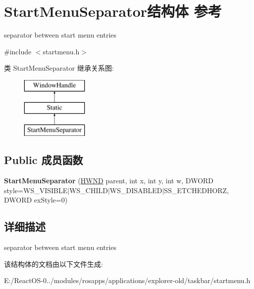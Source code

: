 \hypertarget{struct_start_menu_separator}{}\section{Start\+Menu\+Separator结构体 参考}
\label{struct_start_menu_separator}


separator between start menu entries  




{\ttfamily \#include $<$startmenu.\+h$>$}

类 Start\+Menu\+Separator 继承关系图\+:\begin{figure}[H]
\begin{center}
\leavevmode
\includegraphics[height=3.000000cm]{struct_start_menu_separator}
\end{center}
\end{figure}
\subsection*{Public 成员函数}
\begin{DoxyCompactItemize}
\item 
\mbox{\label{struct_start_menu_separator_a7c6a77ba08f0a69b45c78062ea1a1fc7}} 
{\bfseries Start\+Menu\+Separator} (\hyperlink{interfacevoid}{H\+W\+ND} parent, int x, int y, int w, D\+W\+O\+RD style=W\+S\+\_\+\+V\+I\+S\+I\+B\+LE$\vert$W\+S\+\_\+\+C\+H\+I\+LD$\vert$W\+S\+\_\+\+D\+I\+S\+A\+B\+L\+ED$\vert$S\+S\+\_\+\+E\+T\+C\+H\+E\+D\+H\+O\+RZ, D\+W\+O\+RD ex\+Style=0)
\end{DoxyCompactItemize}


\subsection{详细描述}
separator between start menu entries 

该结构体的文档由以下文件生成\+:\begin{DoxyCompactItemize}
\item 
E\+:/\+React\+O\+S-\/0../modules/rosapps/applications/explorer-\/old/taskbar/startmenu.\+h\end{DoxyCompactItemize}
